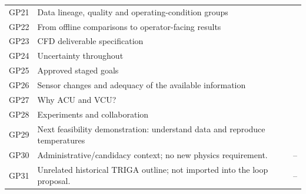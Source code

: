 \begin{longtable}{@{}p{0.5in}p{4.80in}p{0.4in}@{}}
GP21 & Data lineage, quality and operating-condition groups & \hyperref[subsec:data-lineage-quality-and-operating-condition-groups]{\pageref*{subsec:data-lineage-quality-and-operating-condition-groups}}\\
GP22 & From offline comparisons to operator-facing results & \hyperref[subsec:from-offline-comparisons-to-operator-facing-results]{\pageref*{subsec:from-offline-comparisons-to-operator-facing-results}}\\
GP23 & CFD deliverable specification & \hyperref[subsec:cfd-deliverable-specification]{\pageref*{subsec:cfd-deliverable-specification}}\\
GP24 & Uncertainty throughout & \hyperref[subsec:uncertainty-throughout]{\pageref*{subsec:uncertainty-throughout}}\\
GP25 & Approved staged goals & \hyperref[subsec:staged-research-goals]{\pageref*{subsec:staged-research-goals}}\\
GP26 & Sensor changes and adequacy of the available information & \hyperref[subsec:sensor-changes-and-adequacy-of-the-available-information]{\pageref*{subsec:sensor-changes-and-adequacy-of-the-available-information}}\\
GP27 & Why ACU and VCU? & \hyperref[subsec:why-acu-and-vcu]{\pageref*{subsec:why-acu-and-vcu}}\\
GP28 & Experiments and collaboration & \hyperref[subsec:experiments-and-collaboration]{\pageref*{subsec:experiments-and-collaboration}}\\
GP29 & Next feasibility demonstration: understand data and reproduce temperatures & \hyperref[subsec:next-feasibility-demonstration-understand-data-and-reproduce-temperatures]{\pageref*{subsec:next-feasibility-demonstration-understand-data-and-reproduce-temperatures}}\\
GP30 & Administrative/candidacy context; no new physics requirement. & --\\
GP31 & Unrelated historical TRIGA outline; not imported into the loop proposal. & --\\
\end{longtable}\endgroup
